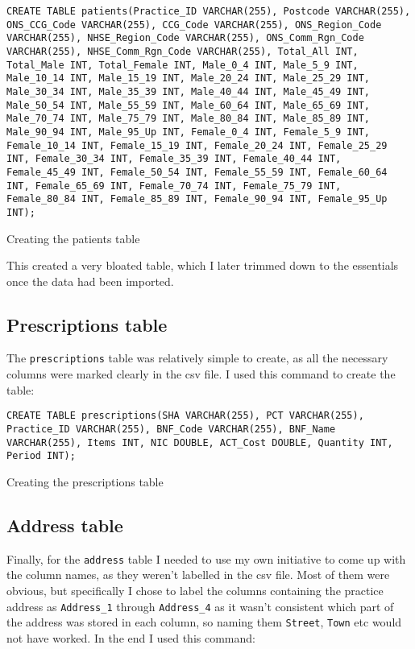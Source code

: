 \documentclass{report}
\begin{document}
\begin{listing}[h]
\begin{verbatim}
CREATE TABLE patients(Practice_ID VARCHAR(255), Postcode VARCHAR(255), ONS_CCG_Code VARCHAR(255), CCG_Code VARCHAR(255), ONS_Region_Code VARCHAR(255), NHSE_Region_Code VARCHAR(255), ONS_Comm_Rgn_Code VARCHAR(255), NHSE_Comm_Rgn_Code VARCHAR(255), Total_All INT, Total_Male INT, Total_Female INT, Male_0_4 INT, Male_5_9 INT, Male_10_14 INT, Male_15_19 INT, Male_20_24 INT, Male_25_29 INT, Male_30_34 INT, Male_35_39 INT, Male_40_44 INT, Male_45_49 INT, Male_50_54 INT, Male_55_59 INT, Male_60_64 INT, Male_65_69 INT, Male_70_74 INT, Male_75_79 INT, Male_80_84 INT, Male_85_89 INT, Male_90_94 INT, Male_95_Up INT, Female_0_4 INT, Female_5_9 INT, Female_10_14 INT, Female_15_19 INT, Female_20_24 INT, Female_25_29 INT, Female_30_34 INT, Female_35_39 INT, Female_40_44 INT, Female_45_49 INT, Female_50_54 INT, Female_55_59 INT, Female_60_64 INT, Female_65_69 INT, Female_70_74 INT, Female_75_79 INT, Female_80_84 INT, Female_85_89 INT, Female_90_94 INT, Female_95_Up INT);
\end{verbatim}
\caption{Creating the patients table}
\label{lst: createin patients table}
\end{listing}

This created a very bloated table, which I later trimmed down to the essentials once the data had been imported.

\subsection{Prescriptions table}
The \texttt{prescriptions} table was relatively simple to create, as all the necessary columns were marked clearly in the csv file. I used this command to create the table:

\begin{listing}[ht]
\begin{verbatim}
CREATE TABLE prescriptions(SHA VARCHAR(255), PCT VARCHAR(255), Practice_ID VARCHAR(255), BNF_Code VARCHAR(255), BNF_Name VARCHAR(255), Items INT, NIC DOUBLE, ACT_Cost DOUBLE, Quantity INT, Period INT);
\end{verbatim}
\caption{Creating the prescriptions table}
\label{lst: creating prescriptions table}
\end{listing}

\subsection{Address table}
Finally, for the \texttt{address} table I needed to use my own initiative to come up with the column names, as they weren't labelled in the csv file. Most of them were obvious, but specifically I chose to label the columns containing the practice address as \texttt{Address\_1} through \texttt{Address\_4} as it wasn't consistent which part of the address was stored in each column, so naming them \texttt{Street}, \texttt{Town} etc would not have worked. In the end I used this command:
\end{document}
